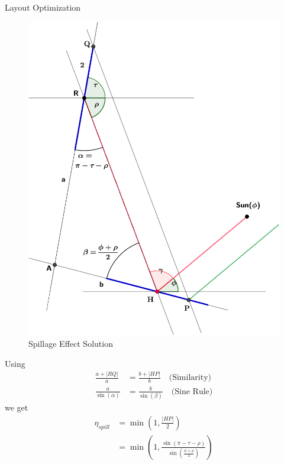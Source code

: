 \documentclass[10pt, xcolor={dvipsnames}]{beamer}
\begin{document}
\begin{frame}{Layout Optimization}
\begin{minipage}[t]{0.5\textwidth}
\begin{center}
\begin{figure}
\includegraphics[width=.99\textwidth]{../figures/spillage-solving-crop.pdf}
\caption{Spillage Effect Solution}
\end{figure}
\end{center}
\end{minipage}%
\begin{minipage}[t]{0.5\textwidth}
\vspace{2mm}
Using 
\begin{align*}
\frac{a + |RQ|}{a} &= \frac{b + |HP|}{b}
\quad \text{(Similarity)} \\[.5em]
\frac{a}{\sin(\alpha)} &= \frac{b}{\sin(\beta)}
\quad \text{(Sine Rule)}
\end{align*}
we get
\begin{align}
\eta_{spill} &= \min \left(1, \frac{|HP|}{2}\right) \\[.5em]
&= \min \left(1, 
\frac{\sin(\pi - \tau - \rho)}
{\sin \left( \frac{\phi + \rho}{2} \right)}
\right)
\end{align}
\end{minipage}
\end{frame}
\end{document}
